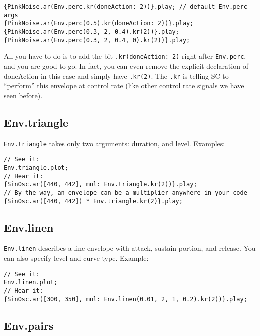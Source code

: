  
\begin{lstlisting}[style=SuperCollider-IDE, basicstyle=\scttfamily\footnotesize]
{PinkNoise.ar(Env.perc.kr(doneAction: 2))}.play; // default Env.perc args
{PinkNoise.ar(Env.perc(0.5).kr(doneAction: 2))}.play; 
{PinkNoise.ar(Env.perc(0.3, 2, 0.4).kr(2))}.play;
{PinkNoise.ar(Env.perc(0.3, 2, 0.4, 0).kr(2))}.play;
\end{lstlisting}
 

All you have to do is to add the bit \texttt{.kr(doneAction: 2)} right after \texttt{Env.perc}, and you are good to go. In fact, you can even remove the explicit declaration of doneAction in this case and simply have \texttt{.kr(2)}. The \texttt{.kr} is telling SC to ``perform'' this envelope at control rate (like other control rate signals we have seen before).

\subsection{Env.triangle}

\texttt{Env.triangle} takes only two arguments: duration, and level. Examples:

 
\begin{lstlisting}[style=SuperCollider-IDE, basicstyle=\scttfamily\footnotesize]
// See it:
Env.triangle.plot;
// Hear it:
{SinOsc.ar([440, 442], mul: Env.triangle.kr(2))}.play;
// By the way, an envelope can be a multiplier anywhere in your code
{SinOsc.ar([440, 442]) * Env.triangle.kr(2)}.play;
\end{lstlisting}

\subsection{Env.linen}

\texttt{Env.linen} describes a line envelope with attack, sustain portion, and release. You can also specify level and curve type. Example:

\begin{lstlisting}[style=SuperCollider-IDE, basicstyle=\scttfamily\footnotesize]
// See it:
Env.linen.plot;
// Hear it:
{SinOsc.ar([300, 350], mul: Env.linen(0.01, 2, 1, 0.2).kr(2))}.play;
\end{lstlisting}

\subsection{Env.pairs}

